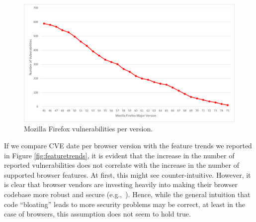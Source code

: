 \begin{figure}[ht]
    \centering
    \includegraphics[width=\columnwidth]{figures/Firefox-Vulnerabilities.png}
    \caption{Mozilla Firefox vulnerabilities per version.}
    \label{fig:firefox-vuln}
  \end{figure}


  If we compare CVE date per browser version with the feature trends
  we reported in Figure \ref{fig:featuretrends}, it is evident that
  the increase in the number of reported vulnerabilities does not
  correlate with the increase in the number of supported browser
  features. At first, this might see counter-intuitive. However, it is
  clear that browser vendors are investing heavily into making their
  browser codebase more robust and secure
  (e.g.,~\cite{FirefoxCrashes,ChromeSecure}). Hence, while the general
  intuition that code ``bloating'' leads to more security problems may
  be correct, at least in the case of browsers, this assumption does
  not seem to hold true.
